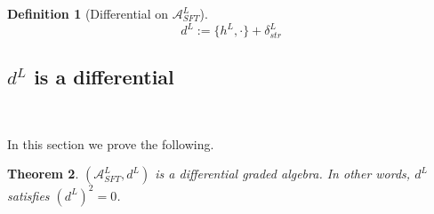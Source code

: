 \documentclass[a4paper,final, reqno]{amsart}
\theoremstyle{plain}
\newtheorem{Th}{Theorem}[section]
\theoremstyle{definition}
\newtheorem{Def}[Th]{Definition}
\newcommand{\A}{\mathcal{A}}
\begin{document}
	\begin{Def}[Differential on $\A^L_{SFT}$]
		\[d^L := \{h^L,\cdot\} + \delta_{str}^L \]
	\end{Def}
	
	
	
	
	
	
	\subsection{$d^L$ is a differential}\-\
	
	In this section we prove the following. 
	
	\begin{Th}\label{thm:dL2=0}
		$(\A^L_{SFT}, d^L)$ is a differential graded algebra. In other words, $d^L$ satisfies $(d^L)^2 = 0$. 
	\end{Th}
	
\end{document}
